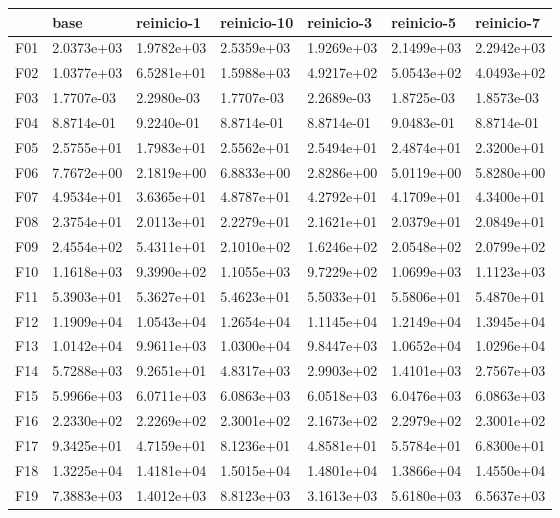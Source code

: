 \begin{tabular}{lllllll}
\toprule
{} &        base &  reinicio-1 & reinicio-10 &  reinicio-3 &  reinicio-5 &  reinicio-7 \\
\midrule
F01  &  2.0373e+03 &  1.9782e+03 &  2.5359e+03 &  1.9269e+03 &  2.1499e+03 &  2.2942e+03 \\
F02  &  1.0377e+03 &  6.5281e+01 &  1.5988e+03 &  4.9217e+02 &  5.0543e+02 &  4.0493e+02 \\
F03  &  1.7707e-03 &  2.2980e-03 &  1.7707e-03 &  2.2689e-03 &  1.8725e-03 &  1.8573e-03 \\
F04  &  8.8714e-01 &  9.2240e-01 &  8.8714e-01 &  8.8714e-01 &  9.0483e-01 &  8.8714e-01 \\
F05  &  2.5755e+01 &  1.7983e+01 &  2.5562e+01 &  2.5494e+01 &  2.4874e+01 &  2.3200e+01 \\
F06  &  7.7672e+00 &  2.1819e+00 &  6.8833e+00 &  2.8286e+00 &  5.0119e+00 &  5.8280e+00 \\
F07  &  4.9534e+01 &  3.6365e+01 &  4.8787e+01 &  4.2792e+01 &  4.1709e+01 &  4.3400e+01 \\
F08  &  2.3754e+01 &  2.0113e+01 &  2.2279e+01 &  2.1621e+01 &  2.0379e+01 &  2.0849e+01 \\
F09  &  2.4554e+02 &  5.4311e+01 &  2.1010e+02 &  1.6246e+02 &  2.0548e+02 &  2.0799e+02 \\
F10  &  1.1618e+03 &  9.3990e+02 &  1.1055e+03 &  9.7229e+02 &  1.0699e+03 &  1.1123e+03 \\
F11  &  5.3903e+01 &  5.3627e+01 &  5.4623e+01 &  5.5033e+01 &  5.5806e+01 &  5.4870e+01 \\
F12  &  1.1909e+04 &  1.0543e+04 &  1.2654e+04 &  1.1145e+04 &  1.2149e+04 &  1.3945e+04 \\
F13  &  1.0142e+04 &  9.9611e+03 &  1.0300e+04 &  9.8447e+03 &  1.0652e+04 &  1.0296e+04 \\
F14  &  5.7288e+03 &  9.2651e+01 &  4.8317e+03 &  2.9903e+02 &  1.4101e+03 &  2.7567e+03 \\
F15  &  5.9966e+03 &  6.0711e+03 &  6.0863e+03 &  6.0518e+03 &  6.0476e+03 &  6.0863e+03 \\
F16  &  2.2330e+02 &  2.2269e+02 &  2.3001e+02 &  2.1673e+02 &  2.2979e+02 &  2.3001e+02 \\
F17  &  9.3425e+01 &  4.7159e+01 &  8.1236e+01 &  4.8581e+01 &  5.5784e+01 &  6.8300e+01 \\
F18  &  1.3225e+04 &  1.4181e+04 &  1.5015e+04 &  1.4801e+04 &  1.3866e+04 &  1.4550e+04 \\
F19  &  7.3883e+03 &  1.4012e+03 &  8.8123e+03 &  3.1613e+03 &  5.6180e+03 &  6.5637e+03 \\

\end{tabular}
